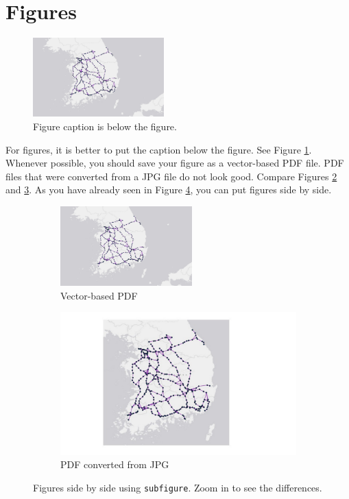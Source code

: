 \documentclass[letterpaper, 11pt]{article}
\begin{document}
\section{Figures} \label{sec:figures}


\begin{figure} \centering
\includegraphics[width=0.45\textwidth]{map}
\caption{Figure caption is below the figure.}
\label{fig:map}
\end{figure}

For figures, it is better to put the caption below the figure. See Figure \ref{fig:map}. Whenever possible, you should save your figure as a vector-based PDF file. PDF files that were converted from a JPG file do not look good. Compare Figures \ref{fig:map-pdf} and \ref{fig:map-jpg}. As you have already seen in Figure \ref{fig:side-by-side}, you can put figures side by side.



\begin{figure} \centering
\begin{subfigure}[b]{0.4\textwidth}
\includegraphics[width=2in]{map}
\caption{Vector-based PDF}
\label{fig:map-pdf}
\end{subfigure}
%
\begin{subfigure}[b]{0.4\textwidth}
\includegraphics[width=4in]{map-jpg}
\caption{PDF converted from JPG}
\label{fig:map-jpg}
\end{subfigure}
\caption{Figures side by side using \texttt{subfigure}. Zoom in to see the differences.}
\label{fig:side-by-side}
\end{figure}
\end{document}
